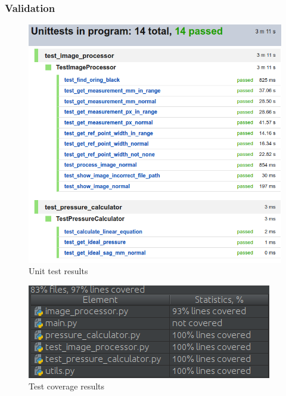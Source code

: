 	\subsubsection{Validation}
		\begin{figure}[h!]
			\centering
			\includegraphics[scale=0.5]{../images/results/test_results.png}
			\caption{Unit test results}
			\label{fig:test_results}
		\end{figure}
		\begin{figure}[h!]
			\centering
			\includegraphics[scale=0.7]{../images/results/coverage.png}
			\caption{Test coverage results}
			\label{fig:coverage}
		\end{figure}
